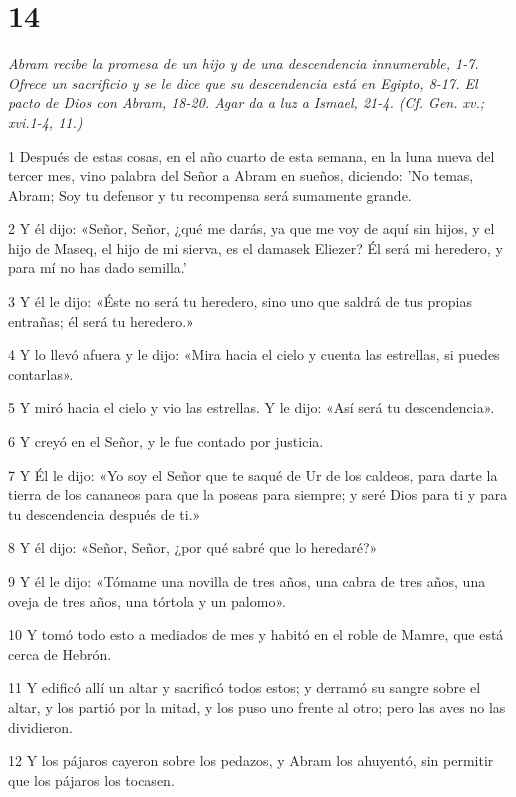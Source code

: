 \chapter{14}

\par \textit{Abram recibe la promesa de un hijo y de una descendencia innumerable, 1-7. Ofrece un sacrificio y se le dice que su descendencia está en Egipto, 8-17. El pacto de Dios con Abram, 18-20. Agar da a luz a Ismael, 21-4. (Cf. Gen. xv.; xvi.1-4, 11.)}


\par 1 Después de estas cosas, en el año cuarto de esta semana, en la luna nueva del tercer mes, vino palabra del Señor a Abram en sueños, diciendo: 'No temas, Abram; Soy tu defensor y tu recompensa será sumamente grande.
\par 2 Y él dijo: «Señor, Señor, ¿qué me darás, ya que me voy de aquí sin hijos, y el hijo de Maseq, el hijo de mi sierva, es el damasek Eliezer? Él será mi heredero, y para mí no has dado semilla.'
\par 3 Y él le dijo: «Éste no será tu heredero, sino uno que saldrá de tus propias entrañas; él será tu heredero.»
\par 4 Y lo llevó afuera y le dijo: «Mira hacia el cielo y cuenta las estrellas, si puedes contarlas».
\par 5 Y miró hacia el cielo y vio las estrellas. Y le dijo: «Así será tu descendencia».
\par 6 Y creyó en el Señor, y le fue contado por justicia.
\par 7 Y Él le dijo: «Yo soy el Señor que te saqué de Ur de los caldeos, para darte la tierra de los cananeos para que la poseas para siempre; y seré Dios para ti y para tu descendencia después de ti.»
\par 8 Y él dijo: «Señor, Señor, ¿por qué sabré que lo heredaré?»
\par 9 Y él le dijo: «Tómame una novilla de tres años, una cabra de tres años, una oveja de tres años, una tórtola y un palomo».
\par 10 Y tomó todo esto a mediados de mes y habitó en el roble de Mamre, que está cerca de Hebrón.
\par 11 Y edificó allí un altar y sacrificó todos estos; y derramó su sangre sobre el altar, y los partió por la mitad, y los puso uno frente al otro; pero las aves no las dividieron.
\par 12 Y los pájaros cayeron sobre los pedazos, y Abram los ahuyentó, sin permitir que los pájaros los tocasen.
